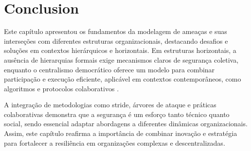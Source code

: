 
%

\chapter{Conclusion}
\label{cha:conclusion}

\glsresetall

Este capítulo apresentou os fundamentos da modelagem de ameaças e suas
interseções com diferentes estruturas organizacionais, destacando desafios
e soluções em contextos hierárquicos e horizontais. Em estruturas
horizontais, a ausência de hierarquias formais exige mecanismos claros de
segurança coletiva, enquanto o centralismo democrático oferece um modelo
para combinar participação e execução eficiente, aplicável em contextos
contemporâneos, como algoritmos e protocolos colaborativos \cite{Colbac,
EstatutosDoPCP}.

A integração de metodologias como \gls{stride}, árvores de ataque e
práticas colaborativas demonstra que a segurança é um esforço tanto técnico
quanto social, sendo essencial adaptar abordagens a diferentes dinâmicas
organizacionais. Assim, este capítulo reafirma a importância de combinar
inovação e estratégia para fortalecer a resiliência em organizações
complexas e descentralizadas.